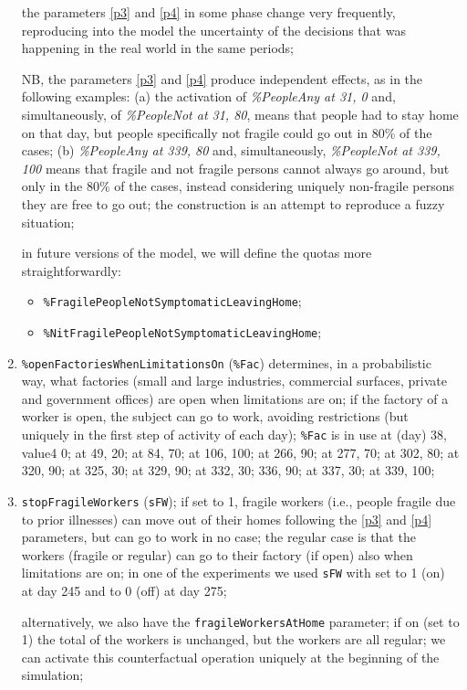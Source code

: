 \documentclass[graybox]{svmult}
\begin{document}
\begin{enumerate}[label=\roman*]
the parameters \ref{p3} and \ref{p4} in some phase change very frequently, reproducing into the model the uncertainty of the decisions that was happening  in the real world in the same periods; 

NB, the parameters \ref{p3} and \ref{p4} produce independent effects, as in the following examples: (a) the activation of \emph{\%PeopleAny at 31, 0} and, simultaneously, of \emph{\%PeopleNot at 31, 80}, means that people had to stay home on that day, but people specifically not fragile could go out in 80\% of the cases; (b) \emph{\%PeopleAny at 339, 80} and, simultaneously, \emph{\%PeopleNot at 339, 100} means that fragile and not fragile persons cannot always go around, but only in the 80\% of the cases, instead considering uniquely non-fragile persons they are free to go out; the construction is an attempt to reproduce a fuzzy situation;

in future versions of the model, we will define the quotas more straightforwardly:
\begin{itemize}
\item \verb|%FragilePeopleNotSymptomaticLeavingHome|;
\item \verb|%NitFragilePeopleNotSymptomaticLeavingHome|;
\end{itemize}

\item \label{p5} \verb|%openFactoriesWhenLimitationsOn| (\verb|%Fac|) 
determines, in a probabilistic way, what factories (small and large industries, commercial surfaces, private and government offices)
are open when limitations are on; if the factory of a worker is open, the subject can go to work, avoiding restrictions (but uniquely in the first step of activity of each day); \verb|%Fac| 
is in use at (day) 38, value4 0; at 49, 20; at 84, 70; at 106, 100; at 266, 90; at 277, 70; at 302, 80; at 320, 90; at 325, 30;
at 329, 90; at 332, 30; 336, 90; at 337, 30; at 339, 100;

\item \label{p6} \verb|stopFragileWorkers|  (\verb|sFW|); if set to 1, fragile workers (i.e., people fragile due to prior illnesses) can move out of their homes following the \ref{p3} and \ref{p4} parameters, but can go to work in no case; the regular case is that the workers (fragile or regular) can go to their factory (if open) also when limitations are on; in one of the experiments we used \verb|sFW| with set to 1 (on) at day 245  and to 0 (off) at day 275;

alternatively, we also have the \verb|fragileWorkersAtHome| parameter; if on (set to 1) the total of the workers is unchanged, but the workers are all regular; we can activate this counterfactual operation uniquely at the beginning of the simulation;


\end{enumerate}
\end{document}
